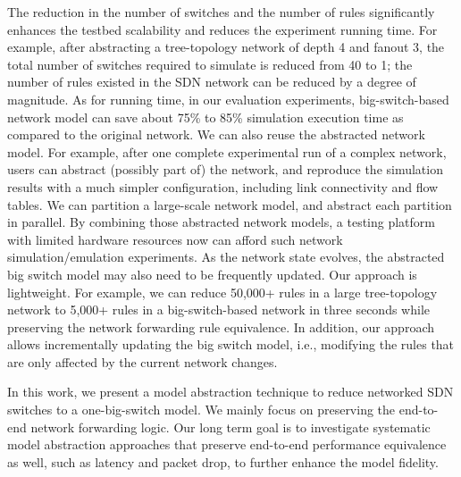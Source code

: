 The reduction in the number of switches and the number of rules significantly enhances the testbed scalability and reduces the experiment running time.
For example, after abstracting a tree-topology network of depth 4 and fanout 3,
the total number of switches required to simulate is reduced from 40 to 1;
the number of rules existed in the SDN network can be reduced by a degree of magnitude.
As for running time, in our evaluation experiments, big-switch-based network model can save about
75\% to 85\% simulation execution time as compared to the original network.
We can also reuse the abstracted network model.
For example, after one complete experimental run of a complex network,
users can abstract (possibly part of) the network, and reproduce the simulation results with
a much simpler configuration, including link connectivity and flow tables.
We can partition a large-scale network model, and abstract each partition in parallel.
By combining those abstracted network models, a testing platform with limited hardware resources
now can afford such network simulation/emulation experiments.
As the network state evolves, the abstracted big switch model may also need to be frequently updated.
Our approach is lightweight. For example, we can reduce 50,000+ rules in a large tree-topology network
to 5,000+ rules in a big-switch-based network in three seconds
while preserving the network forwarding rule equivalence.
In addition, our approach allows incrementally updating the big switch model,
i.e., modifying the rules that are only affected by the current network changes.

In this work, we present a model abstraction technique to reduce networked SDN switches to a one-big-switch model. We mainly focus on preserving the end-to-end network forwarding logic.
Our long term goal is to investigate systematic model abstraction approaches that preserve end-to-end performance equivalence as well, such as latency and packet drop, to further enhance the model fidelity.

